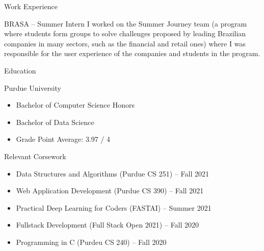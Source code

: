 \documentclass{article}
\newlength{\tabin}
\newlength{\secsep}
\newcommand{\lineunder}{\vspace*{-8pt} \\ \hspace*{-6pt} \hrulefill \\ \vspace*{-15pt}}
\newenvironment{tabbedsection}[1]{
  \begin{list}{}{
      \setlength{\itemsep}{0pt}
      \setlength{\labelsep}{0pt}
      \setlength{\labelwidth}{0pt}
      \setlength{\leftmargin}{\tabin}
      \setlength{\rightmargin}{\tabin}
      \setlength{\listparindent}{0pt}
      \setlength{\parsep}{0pt}
      \setlength{\parskip}{0pt}
      \setlength{\partopsep}{0pt}
      \setlength{\topsep}{#1}
    }
  \item[]
}{\end{list}}
\newenvironment{resume_section}[1]{
  \filbreak
  \vspace{2\secsep}
  \textsc{\large#1}
  \lineunder
  \begin{tabbedsection}{\secsep}
}{\end{tabbedsection}}
\newenvironment{resume_subsection}[2][]{
  \textbf{#2} \hfill {\footnotesize #1} \hspace{2em}
  \begin{tabbedsection}{0.5\secsep}
}{\end{tabbedsection}}
\newenvironment{subitems}{
  \renewcommand{\labelitemi}{-}
  \begin{itemize}
      \setlength{\labelsep}{1em}
}{\end{itemize}}
\begin{document}
\begin{resume_section}{Work Experience}

	\begin{resume_subsection}{BRASA -- Summer Intern}
		I worked on the Summer Journey team (a program where students form groups to solve challenges proposed by leading Brazilian companies in many sectors, such as the financial and retail ones) where I was responsible for the user experience of the companies and students in the program.
	\end{resume_subsection}

\end{resume_section}

\begin{resume_section}{Education}
  
  \begin{resume_subsection}{Purdue University}
    
    \begin{subitems}
      \item Bachelor of Computer Science Honors
      \item Bachelor of Data Science
      \item Grade Point Average: 3.97 / 4
    \end{subitems}
  
  \end{resume_subsection}
  
  \begin{resume_subsection}[]{Relevant Corsework}
  	
	\begin{subitems}
		\item Data Structures and Algorithms (Purdue CS 251) -- Fall 2021
		\item Web Application Development (Purdue CS 390) -- Fall 2021
		\item Practical Deep Learning for Coders (FASTAI) -- Summer 2021
		\item Fullstack Development (Full Stack Open 2021) -- Fall 2020
		\item Programming in C (Purdeu CS 240) -- Fall 2020
	\end{subitems}  	
  	
  \end{resume_subsection}
  
\end{resume_section}
\end{document}
